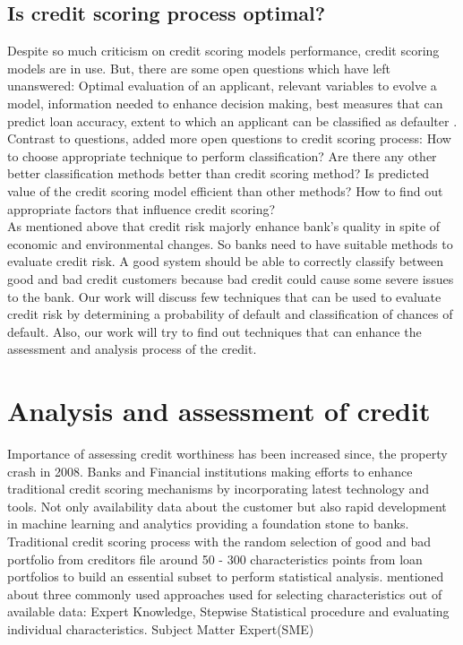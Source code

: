 {\subsection{Is credit scoring process optimal?}\label{C.optimal}
Despite so much criticism on credit scoring models performance, credit scoring models are in use. But, there are some open questions which have left unanswered: Optimal evaluation of an applicant, relevant variables to evolve a model, information needed to enhance decision making, best measures that can predict loan accuracy, extent to which an applicant can be classified as defaulter \citep{al2002credit}.\\

Contrast to \citet{al2002credit} questions, \citet{abdou2009credit} added more open questions to credit scoring process: How to choose appropriate technique to perform classification? Are there any other better classification methods better than credit scoring method? Is predicted value of the credit scoring model efficient than other methods? How to find out appropriate factors that influence credit scoring?\\

As mentioned above that credit risk majorly enhance bank's quality in spite of economic and environmental changes. So banks need to have suitable methods to evaluate credit risk. A good system should be able to correctly classify between good and bad credit customers because bad credit could cause some severe issues to the bank. Our work will discuss few techniques that can be used to evaluate credit risk by determining a probability of default and classification of chances of default. Also, our work will try to find out techniques that can enhance the assessment and analysis process of the credit.

\section{Analysis and assessment of credit}\label{tech.crisk}

Importance of assessing credit worthiness has been increased since, the property crash in 2008. Banks and Financial institutions making efforts to enhance traditional credit scoring mechanisms by incorporating latest technology and tools. Not only availability data about the customer but also rapid development in machine learning and analytics providing a foundation stone to banks. \\

Traditional credit scoring process with the random selection of good and bad portfolio from creditors file around 50 - 300 \citet{capon1982credit} characteristics points from loan portfolios to build an essential subset to perform statistical analysis. \citet{10.2307/2983268} mentioned about three commonly used approaches used for selecting characteristics out of available data: Expert Knowledge, Stepwise Statistical procedure and evaluating individual characteristics. Subject Matter Expert(SME) \\

}
